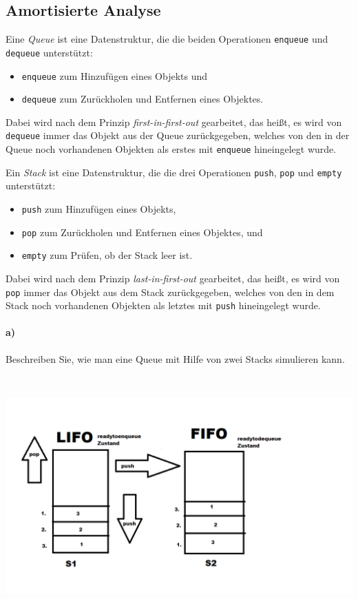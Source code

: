 \documentclass[paper=a4, fontsize=11pt]{scrartcl}
\numberwithin{equation}{section}
\numberwithin{figure}{section}
\numberwithin{table}{section}
\begin{document}
\subsection{Amortisierte Analyse}
Eine \emph{Queue} ist eine Datenstruktur, die die beiden Operationen \texttt{enqueue} und \texttt{dequeue} unterstützt:
%
\begin{itemize}
\item \texttt{enqueue} zum Hinzufügen eines Objekts und
\item \texttt{dequeue} zum Zurückholen und Entfernen eines Objektes.
\end{itemize}

\noindent Dabei wird nach dem Prinzip \emph{first-in-first-out} gearbeitet, das heißt, es wird von \texttt{dequeue} immer das Objekt aus der Queue zurückgegeben, welches von den in der Queue noch vorhandenen Objekten als erstes mit \texttt{enqueue} hineingelegt wurde. 

\smallskip
\noindent
Ein \emph{Stack} ist eine Datenstruktur, die die drei Operationen
\texttt{push}, \texttt{pop} und \texttt{empty} unterstützt:
%
\begin{itemize}
\item \texttt{push} zum Hinzufügen eines Objekts,
\item \texttt{pop} zum Zurückholen und Entfernen eines Objektes, und
\item \texttt{empty} zum Prüfen, ob der Stack leer ist.
\end{itemize}

\noindent Dabei wird nach dem Prinzip \emph{last-in-first-out} gearbeitet, das heißt, es wird von \texttt{pop} immer das Objekt aus dem Stack zurückgegeben, welches von den in dem Stack noch vorhandenen Objekten als letztes mit \texttt{push} hineingelegt wurde. 

\paragraph{a)} 
Beschreiben Sie, wie man eine Queue mit Hilfe von zwei Stacks simulieren kann. \\

\includegraphics[width=15cm,height=10cm]{QueueStack.png} \\
\end{document}
